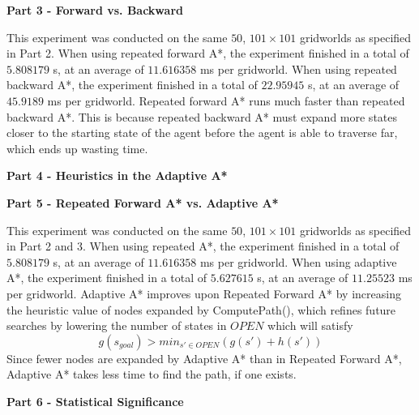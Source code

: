 \documentclass[11pt]{article}
\begin{document}
    \begin{center}
        \Large
        \textbf{Part 3 - Forward vs. Backward}
    \end{center}
    \normalsize
    This experiment was conducted on the same $50$, $101 \times 101$ gridworlds as specified in Part 2.
    When using repeated forward A*, the experiment finished in a total of $5.808179$ s, at an average of $11.616358$ ms per gridworld.
    When using repeated backward A*, the experiment finished in a total of $22.95945$ s, at an average of $45.9189$ ms per gridworld.
    \newline\newline
    Repeated forward A* runs much faster than repeated backward A*.
    This is because repeated backward A* must expand more states closer to the starting state of the agent before the agent is able to traverse far,
    which ends up wasting time.


    \begin{center}
        \Large
        \textbf{Part 4 - Heuristics in the Adaptive A*}
    \end{center}
    \normalsize
    
    
    \begin{center}
        \Large
        \textbf{Part 5 - Repeated Forward A* vs. Adaptive A*}
    \end{center}
    \normalsize
    This experiment was conducted on the same $50$, $101 \times 101$ gridworlds as specified in Part 2 and 3.
    When using repeated A*, the experiment finished in a total of $5.808179$ s, at an average of $11.616358$ ms per gridworld.
    When using adaptive A*, the experiment finished in a total of $5.627615$ s, at an average of $11.25523$ ms per gridworld.
    \newline\newline
    Adaptive A* improves upon Repeated Forward A* by increasing the heuristic value of nodes expanded by ComputePath(), which refines
    future searches by lowering the number of states in $OPEN$ which will satisfy \[g(s_{goal}) > min_{s'\in OPEN}\left(g(s') + h(s')\right)\]
    Since fewer nodes are expanded by Adaptive A* than in Repeated Forward A*, Adaptive A* takes less time to find the path, if one exists.

    \begin{center}
        \Large
        \textbf{Part 6 - Statistical Significance}
    \end{center}
    \normalsize
    
    
\end{document}
